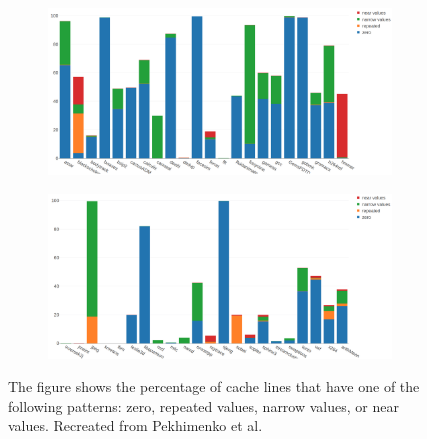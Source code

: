 \begin{figure}
    \begin{subfigure}[t]{\textwidth}
        \includegraphics[width=\textwidth]{BDIPotential1.png}
    \end{subfigure}
    \begin{subfigure}[b]{\textwidth}
        \includegraphics[width=\textwidth]{BDIPotential2.png}
    \end{subfigure}
    \caption[Intra-line Patterns]{The figure shows the percentage of cache lines that have one of the following patterns: zero, repeated values, narrow values, or near values. Recreated from Pekhimenko et al.\protect\cite{bdi}}
    \label{fig:BDIPotential}
\end{figure}
